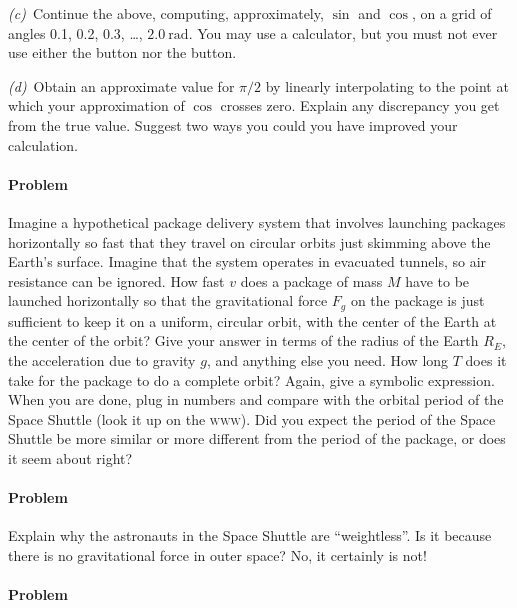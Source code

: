 \documentclass[12pt]{article}
\newcounter{problem}
\begin{document}
\textsl{(c)}~Continue the above, computing, approximately, $\sin$ and
$\cos$, on a grid of angles 0.1, 0.2, 0.3, \ldots, $2.0~\mathrm{rad}$.
You may use a calculator, but you must not ever use either the
\fbox{$\sin$} button nor the \fbox{$\cos$} button.

\textsl{(d)}~Obtain an approximate value for $\pi/2$ by linearly
interpolating to the point at which your approximation of $\cos$
crosses zero.  Explain any discrepancy you get from the true value.
Suggest two ways you could you have improved your calculation.

\paragraph{Problem~\theproblem}

Imagine a hypothetical package delivery system that involves launching
packages horizontally so fast that they travel on circular orbits just
skimming above the Earth's surface.  Imagine that the system operates
in evacuated tunnels, so air resistance can be ignored.  How fast $v$
does a package of mass $M$ have to be launched horizontally so that
the gravitational force $F_g$ on the package is just sufficient to
keep it on a uniform, circular orbit, with the center of the Earth at
the center of the orbit?  Give your answer in terms of the radius of
the Earth $R_E$, the acceleration due to gravity $g$, and anything
else you need.  How long $T$ does it take for the package to do a
complete orbit?  Again, give a symbolic expression.  When you are
done, plug in numbers and compare with the orbital period of the Space
Shuttle (look it up on the \textsc{www}).  Did you expect the period
of the Space Shuttle be more similar or more different from the period
of the package, or does it seem about right?

\paragraph{Problem~\theproblem}

Explain why the astronauts in the Space Shuttle are ``weightless''.
Is it because there is no gravitational force in outer space?  No, it
certainly is not!

\paragraph{Problem~\theproblem}
\end{document}
